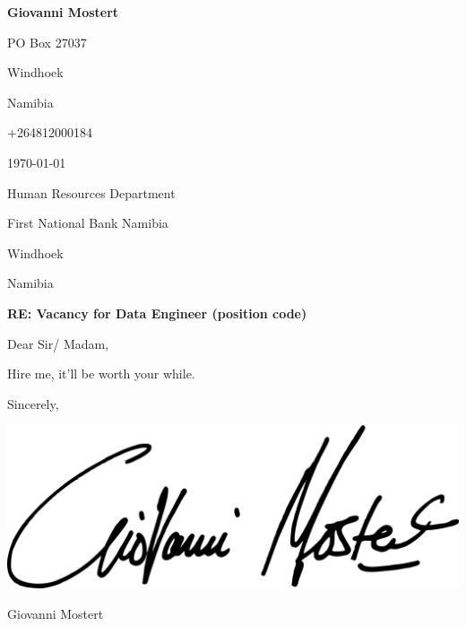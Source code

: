\documentclass{article}
\begin{document}
\hspace*{0.75\linewidth}
\begin{minipage}{0.4\linewidth}
\textbf{Giovanni Mostert} \par
PO Box 27037 \par 
Windhoek \par
Namibia \par
$+$264812000184 \par \medskip
\today
\end{minipage}
\bigskip
\bigskip

\begin{minipage}{0.4\linewidth}
Human Resources Department \par
First National Bank Namibia \par
Windhoek \par
Namibia \par
\end{minipage}
\bigskip

\textbf{RE: Vacancy for Data Engineer (position code)}\par \bigskip \bigskip

Dear Sir/ Madam, \par \bigskip

Hire me, it'll be worth your while. \par \bigskip

Sincerely, \par \medskip

\includegraphics[height=2\baselineskip]{assets/signature} \par
Giovanni Mostert \par
\end{document}
